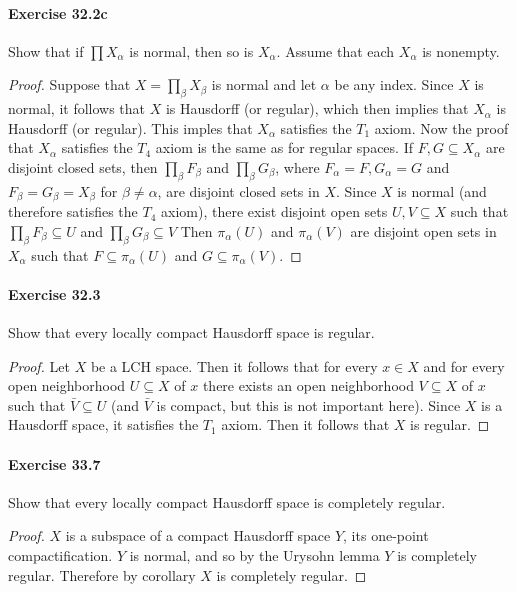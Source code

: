 \documentclass{article}
\begin{document}
\paragraph{Exercise 32.2c} Show that if $\prod X_\alpha$ is normal, then so is $X_\alpha$. Assume that each $X_\alpha$ is nonempty.
\begin{proof}
    Suppose that $X=\prod_\beta X_\beta$ is normal and let $\alpha$ be any index.
Since $X$ is normal, it follows that $X$ is Hausdorff (or regular), which then implies that $X_\alpha$ is Hausdorff (or regular). This imples that $X_\alpha$ satisfies the $T_1$ axiom.
Now the proof that $X_\alpha$ satisfies the $T_4$ axiom is the same as for regular spaces.
If $F, G \subseteq X_\alpha$ are disjoint closed sets, then $\prod_\beta F_\beta$ and $\prod_\beta G_\beta$, where $F_\alpha=F, G_\alpha=G$ and $F_\beta=G_\beta=X_\beta$ for $\beta \neq \alpha$, are disjoint closed sets in $X$.
Since $X$ is normal (and therefore satisfies the $T_4$ axiom), there exist disjoint open sets $U, V \subseteq X$ such that $\prod_\beta F_\beta \subseteq U$ and $\prod_\beta G_\beta \subseteq V$
Then $\pi_\alpha(U)$ and $\pi_\alpha(V)$ are disjoint open sets in $X_\alpha$ such that $F \subseteq \pi_\alpha(U)$ and $G \subseteq \pi_\alpha(V)$.
\end{proof}



\paragraph{Exercise 32.3} Show that every locally compact Hausdorff space is regular.
\begin{proof}
    Let $X$ be a LCH space.
Then it follows that for every $x \in X$ and for every open neighborhood $U \subseteq X$ of $x$ there exists an open neighborhood $V \subseteq X$ of $x$ such that $\bar{V} \subseteq U$ (and $\bar{V}$ is compact, but this is not important here).
Since $X$ is a Hausdorff space, it satisfies the $T_1$ axiom.
Then it follows that $X$ is regular.
\end{proof}



\paragraph{Exercise 33.7} Show that every locally compact Hausdorff space is completely regular.
\begin{proof}
    $X$ is a subspace of a compact Hausdorff space $Y$, its one-point compactification. $Y$ is normal, and so by the Urysohn lemma $Y$ is completely regular. Therefore by corollary $X$ is completely regular.
\end{proof}
\end{document}
